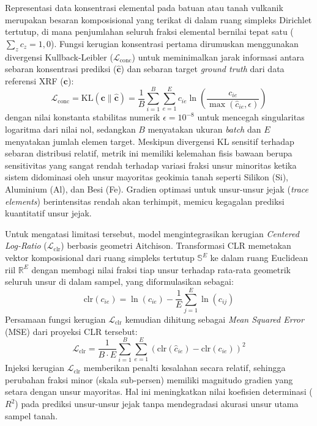 Representasi data konsentrasi elemental pada batuan atau tanah vulkanik merupakan besaran komposisional yang terikat di dalam ruang simpleks Dirichlet tertutup, di mana penjumlahan seluruh fraksi elemental bernilai tepat satu ($\sum_{z} c_z = 1{,}0$). Fungsi kerugian konsentrasi pertama dirumuskan menggunakan divergensi Kullback-Leibler ($\mathcal{L}_{\mathrm{conc}}$) untuk meminimalkan jarak informasi antara sebaran konsentrasi prediksi ($\hat{\mathbf{c}}$) dan sebaran target \textit{ground truth} dari data referensi XRF ($\mathbf{c}$):
\begin{equation}
\mathcal{L}_{\mathrm{conc}} = \text{KL}(\mathbf{c} \parallel \hat{\mathbf{c}}) = \frac{1}{B} \sum_{i=1}^{B} \sum_{e=1}^{E} c_{ie} \ln \left( \frac{c_{ie}}{\max(\hat{c}_{ie}, \epsilon)} \right)
\end{equation}
dengan nilai konstanta stabilitas numerik $\epsilon = 10^{-8}$ untuk mencegah singularitas logaritma dari nilai nol, sedangkan $B$ menyatakan ukuran \textit{batch} dan $E$ menyatakan jumlah elemen target. Meskipun divergensi KL sensitif terhadap sebaran distribusi relatif, metrik ini memiliki kelemahan fisis bawaan berupa sensitivitas yang sangat rendah terhadap variasi fraksi unsur minoritas ketika sistem didominasi oleh unsur mayoritas geokimia tanah seperti Silikon (Si), Aluminium (Al), dan Besi (Fe). Gradien optimasi untuk unsur-unsur jejak (\textit{trace elements}) berintensitas rendah akan terhimpit, memicu kegagalan prediksi kuantitatif unsur jejak.

Untuk mengatasi limitasi tersebut, model mengintegrasikan kerugian \textit{Centered Log-Ratio} ($\mathcal{L}_{\mathrm{clr}}$) berbasis geometri Aitchison. Transformasi CLR memetakan vektor komposisional dari ruang simpleks tertutup $\mathbb{S}^E$ ke dalam ruang Euclidean riil $\mathbb{R}^E$ dengan membagi nilai fraksi tiap unsur terhadap rata-rata geometrik seluruh unsur di dalam sampel, yang diformulasikan sebagai:
\begin{equation}
\text{clr}(c_{ie}) = \ln(c_{ie}) - \frac{1}{E} \sum_{j=1}^{E} \ln(c_{ij})
\end{equation}
Persamaan fungsi kerugian $\mathcal{L}_{\mathrm{clr}}$ kemudian dihitung sebagai \textit{Mean Squared Error} (MSE) dari proyeksi CLR tersebut:
\begin{equation}
\mathcal{L}_{\mathrm{clr}} = \frac{1}{B \cdot E} \sum_{i=1}^{B} \sum_{e=1}^{E} \left( \text{clr}(\hat{c}_{ie}) - \text{clr}(c_{ie}) \right)^2
\end{equation}
Injeksi kerugian $\mathcal{L}_{\mathrm{clr}}$ memberikan penalti kesalahan secara relatif, sehingga perubahan fraksi minor (skala sub-persen) memiliki magnitudo gradien yang setara dengan unsur mayoritas. Hal ini meningkatkan nilai koefisien determinasi ($R^2$) pada prediksi unsur-unsur jejak tanpa mendegradasi akurasi unsur utama sampel tanah.

